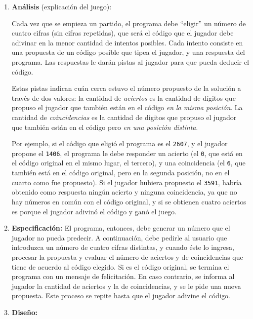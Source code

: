 \begin{enumerate}

\item {\bf Análisis } (explicación del juego):

Cada vez que se empieza un partido, el programa debe \enquote{eligir} un número de
cuatro cifras (sin cifras repetidas), que será el código que el jugador debe
adivinar en la menor cantidad de intentos posibles. Cada intento consiste en
una propuesta de un código posible que tipea el jugador, y una respuesta del
programa. Las respuestas le darán pistas al jugador para que pueda deducir el
código.

Estas pistas indican cuán cerca estuvo el número propuesto de la solución a
través de dos valores: la cantidad de \emph{aciertos} es la cantidad de
dígitos que propuso el jugador que también están en el código \emph{en la
misma posición}. La cantidad de \emph{coincidencias} es la cantidad de
digitos que propuso el jugador que también están en el código pero \emph{en
una posición distinta}.

Por ejemplo, si el código que eligió el programa es el \lstinline!2607!, y el
jugador propone el \lstinline!1406!, el programa le debe responder un acierto (el
\lstinline!0!, que está en el código original en el mismo lugar, el tercero), y
una coincidencia (el \lstinline!6!, que también está en el código original, pero
en la segunda posición, no en el cuarto como fue propuesto). Si el jugador
hubiera propuesto el \lstinline!3591!, habría obtenido como respuesta ningún
acierto y ninguna coincidencia, ya que no hay números en común con el
código original, y si se obtienen cuatro aciertos es porque el jugador
adivinó el código y ganó el juego.

\item {\bf Especificación: }
El programa, entonces, debe generar un número que el jugador no pueda predecir.
A continuación, debe pedirle al usuario que introduzca un número de cuatro
cifras distintas, y cuando éste lo ingresa, procesar la propuesta y evaluar el
número de aciertos y de coincidencias que tiene de acuerdo al código elegido. Si
es el código original, se termina el programa con un mensaje de felicitación. En
caso contrario, se informa al jugador la cantidad de aciertos y la de
coincidencias, y se le pide una nueva propuesta. Este proceso se repite hasta
que el jugador adivine el código.

\item {\bf Diseño:}
\label{str:disenno}


\end{enumerate}
